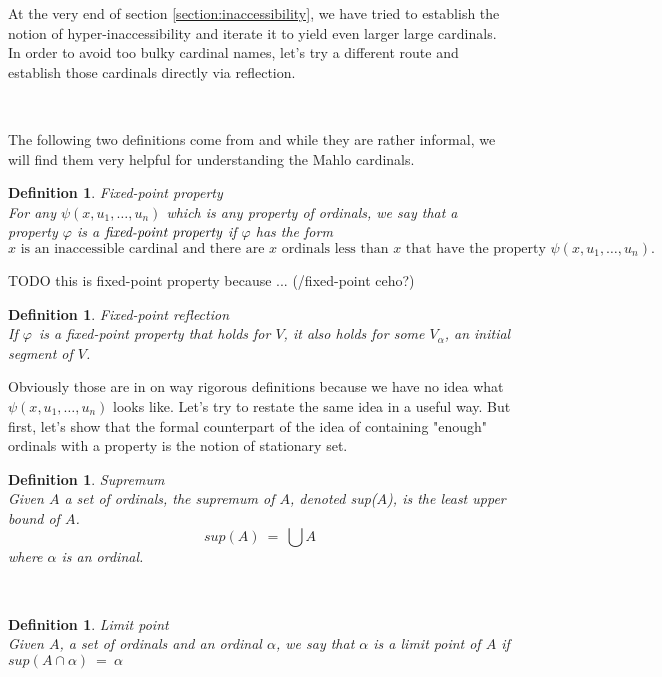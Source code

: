 \documentclass[12pt,a4paper]{article}
\newtheorem{definition}[theorem]{Definition}
\begin{document}
At the very end of section \ref{section:inaccessibility}, we have tried to establish the notion of hyper-inaccessibility and iterate it to yield even larger large cardinals. In order to avoid too bulky cardinal names, let's try a different route and establish those cardinals directly via reflection.

\

The following two definitions come from \cite{Infinity_in_mind} and while they are rather informal, we will find them very helpful for understanding the Mahlo cardinals.
\begin{definition}{Fixed-point property}\\
For any $\psi(x, u_1, \ldots, u_n)$ which is any property of ordinals, we say that a property $\varphi$ is a $\emph{fixed-point property}$ if $\varphi$ has the form
\begin{equation}
\mbox{$x$ is an inaccessible cardinal and there are $x$ ordinals less than $x$ that have the property $\psi(x, u_1, \ldots, u_n)$.}
\end{equation}
\end{definition}

TODO this is fixed-point property because ... (/fixed-point ceho?)
\

\begin{definition}{Fixed-point reflection}\\
If $\varphi$ is a fixed-point property that holds for $V$, it also holds for some $V_\alpha$, an initial segment of $V$.
\end{definition}

Obviously those are in on way rigorous definitions because we have no idea what $\psi(x, u_1, \ldots, u_n)$ looks like. Let's try to restate the same idea in a useful way. But first, let's show that the formal counterpart of the idea of containing "enough" ordinals with a property is the notion of stationary set. 

\begin{definition}{Supremum}\\
Given $A$ a set of ordinals, the supremum of $A$, denoted sup($A$), is the least upper bound of $A$.
\begin{equation}
sup(A)\ =\ \bigcup A
\end{equation}
where $\alpha$ is an ordinal.
\end{definition}

\

\begin{definition}{Limit point}\\
Given $A$, a set of ordinals and an ordinal $\alpha$, we say that $\alpha$ is a \emph{limit point} of $A$ if $sup(A \cap \alpha)\ =\ \alpha$
\end{definition}
\end{document}
